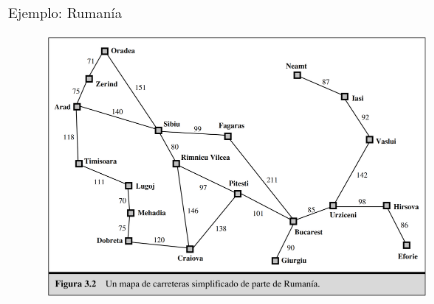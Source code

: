 \begin{frame}{Ejemplo: Rumanía}
\begin{figure}
  \includegraphics[width=10cm]{6_roads_rumania.png}
\end{figure}
\end{frame}